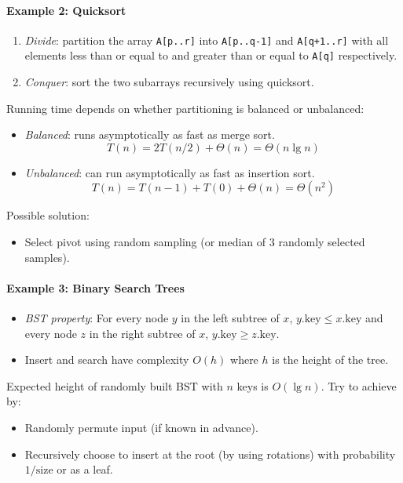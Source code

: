 \documentclass[twocolumn,english]{article}
\numberwithin{equation}{section}
\numberwithin{figure}{section}
\numberwithin{table}{section}
\begin{document}
\paragraph{Example 2: Quicksort}
\begin{enumerate}
\item \emph{Divide}: partition the array \texttt{A{[}p..r{]}} into \texttt{A{[}p..q-1{]}}
and \texttt{A{[}q+1..r{]}} with all elements less than or equal to
and greater than or equal to \texttt{A{[}q{]}} respectively.
\item \emph{Conquer}: sort the two subarrays recursively using quicksort.
\end{enumerate}
Running time depends on whether partitioning is balanced or unbalanced:
\begin{itemize}
\item \emph{Balanced}: runs asymptotically as fast as merge sort.
\[
T\left(n\right)=2T\left(n/2\right)+\Theta\left(n\right)=\Theta\left(n\lg n\right)
\]
\item \emph{Unbalanced}: can run asymptotically as fast as insertion sort.
\[
T\left(n\right)=T\left(n-1\right)+T\left(0\right)+\Theta\left(n\right)=\Theta\left(n^{2}\right)
\]
\end{itemize}
Possible solution:
\begin{itemize}
\item Select pivot using random sampling (or median of 3 randomly selected
samples).
\end{itemize}

\paragraph{Example 3: Binary Search Trees}
\begin{itemize}
\item \emph{BST property}: For every node $y$ in the left subtree of $x$,
$y.\text{key}\leq x.\text{key}$ and every node $z$ in the right
subtree of $x$, $y.\text{key}\geq z.\text{key}$.
\item Insert and search have complexity $O\left(h\right)$ where $h$ is
the height of the tree.
\end{itemize}
Expected height of randomly built BST with $n$ keys is $O\left(\lg n\right)$.
Try to achieve by:
\begin{itemize}
\item Randomly permute input (if known in advance).
\item Recursively choose to insert at the root (by using rotations) with
probability $1/\text{size}$ or as a leaf.
\end{itemize}
\end{document}
